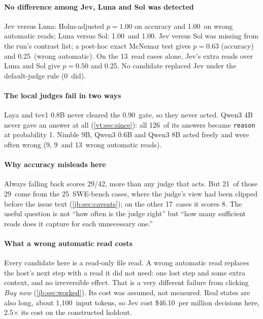 \documentclass[11pt,letterpaper]{article}
\newcommand{\code}[1]{\texttt{#1}}
\newcommand{\MinP}{0.90}
\newcommand{\TrAlwaysK}{29}
\newcommand{\TrAlwaysSOneTwoK}{8}
\newcommand{\TrAlwaysSThreeK}{21}
\newcommand{\TrJevCost}{46.10}
\newcommand{\TrJevCostXFirst}{2.5}
\newcommand{\TrJevInputTokens}{1{,}100}
\newcommand{\TrJevLunaAccPHolm}{1.00}
\newcommand{\TrJevLunaReadsP}{0.50}
\newcommand{\TrJevLunaWaPHolm}{1.00}
\newcommand{\TrJevSolAccP}{0.63}
\newcommand{\TrJevSolReadsP}{0.25}
\newcommand{\TrJevSolWaP}{0.25}
\newcommand{\TrLunaSolAccPHolm}{1.00}
\newcommand{\TrLunaSolWaPHolm}{1.00}
\newcommand{\TrN}{42}
\newcommand{\TrNReplaces}{0}
\newcommand{\TrNimbleWaK}{9}
\newcommand{\TrQwenEightWaK}{13}
\newcommand{\TrQwenFourAbstained}{126}
\newcommand{\TrQwenPtSixWaK}{9}
\newcommand{\TrReadCases}{13}
\newcommand{\TrSOneTwo}{17}
\newcommand{\TrSThree}{25}
\begin{document}
\paragraph{No difference among Jev, Luna and Sol was detected} Jev versus Luna: Holm-adjusted $p = \TrJevLunaAccPHolm$ on
accuracy and \TrJevLunaWaPHolm\ on wrong automatic reads; Luna versus Sol: \TrLunaSolAccPHolm\ and
\TrLunaSolWaPHolm. Jev versus Sol was missing from the run's contrast list; a post-hoc exact McNemar test
gives $p = \TrJevSolAccP$ (accuracy) and \TrJevSolWaP\ (wrong automatic). On the \TrReadCases\ read cases
alone, Jev's extra reads over Luna and Sol give $p = \TrJevLunaReadsP$ and \TrJevSolReadsP. No candidate
replaced Jev under the default-judge rule (\TrNReplaces\ did).

\paragraph{The local judges fail in two ways} Laya and tev1 0.8B never cleared the \MinP\ gate, so they
never acted. Qwen3 4B never gave an answer at all (\cref{vt:sec:since}): all \TrQwenFourAbstained\ of
its answers became \code{reason} at probability 1. Nimble 9B, Qwen3 0.6B and Qwen3 8B acted freely and were
often wrong (\TrNimbleWaK, \TrQwenPtSixWaK\ and \TrQwenEightWaK\ wrong automatic reads).



\paragraph{Why accuracy misleads here} Always falling back scores \TrAlwaysK/\TrN, more than any judge
that acts. But \TrAlwaysSThreeK\ of those \TrAlwaysK\ come from the \TrSThree\ SWE-bench cases, where the
judge's view had been clipped before the issue text (\cref{jb:sec:caveats}); on the other \TrSOneTwo\ cases
it scores \TrAlwaysSOneTwoK. The useful question is not ``how often is the judge right'' but ``how many
sufficient reads does it capture for each unnecessary one.''

\paragraph{What a wrong automatic read costs} Every candidate here is a read-only file read. A wrong
automatic read replaces the host's next step with a read it did not need: one lost step and some extra
context, and no irreversible effect. That is a very different failure from clicking \emph{Buy now}
(\cref{jb:sec:worked}). Its cost was assumed, not measured. Real states are also long, about
\TrJevInputTokens\ input tokens, so Jev cost \$\TrJevCost\ per million decisions here, \TrJevCostXFirst$\times$
its cost on the constructed holdout.
\end{document}
